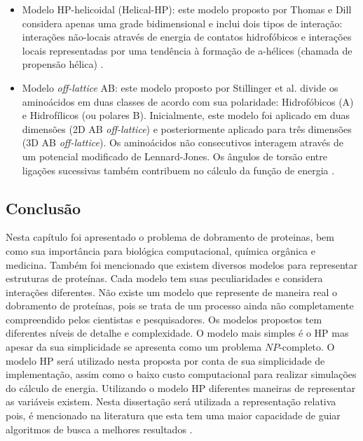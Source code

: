 \begin{itemize}
	\item Modelo HP-helicoidal (Helical-HP): este modelo proposto por Thomas e Dill \cite{thomas1993local} considera apenas uma grade bidimensional e inclui dois tipos de interação: interações não-locais através de energia de contatos hidrofóbicos e interações locais representadas por uma tendência à formação de a-hélices (chamada de propensão hélica) \cite{benitez2015algoritmo}.
	\item Modelo \textit{off-lattice} AB: este modelo proposto por Stillinger et al. \cite{stillinger1993toy} divide os aminoácidos em duas classes de acordo com sua polaridade: Hidrofóbicos (A) e Hidrofílicos (ou polares  B). Inicialmente, este modelo foi aplicado em duas dimensões (2D AB \textit{off-lattice}) e posteriormente aplicado para três dimensões (3D AB \textit{off-lattice}). Os aminoácidos não consecutivos interagem através de um potencial modificado de Lennard-Jones. Os ângulos de torsão entre ligações sucessivas também contribuem no cálculo da função de energia \cite{benitez2015algoritmo}.
	
\end{itemize}




\subsection{Conclusão}
\label{Problema de Dobramento de Proteínas:Conclusao}

Nesta capítulo foi apresentado o problema de dobramento de proteinas, bem como sua importância para biológica computacional, química orgânica e medicina. Também foi mencionado que existem diversos modelos para representar estruturas de proteínas. Cada modelo tem suas peculiaridades e considera interações diferentes. Não existe um modelo que represente de maneira real o dobramento de proteínas, pois se trata de um processo ainda não completamente compreendido pelos cientistas e pesquisadores. Os modelos propostos tem diferentes níveis de detalhe e complexidade. O modelo mais simples é o HP mas apesar da sua simplicidade se apresenta como um problema $NP$-completo. O modelo HP será utilizado nesta proposta por conta de sua simplicidade de implementação, assim como o baixo custo computacional para realizar simulações do cálculo de energia. Utilizando o modelo HP diferentes maneiras de representar as variáveis existem. Nesta dissertação será utilizada a representação relativa pois, é mencionado na literatura que esta tem uma maior capacidade de guiar algoritmos de busca a melhores resultados  \cite{krasnogor1999protein}.
